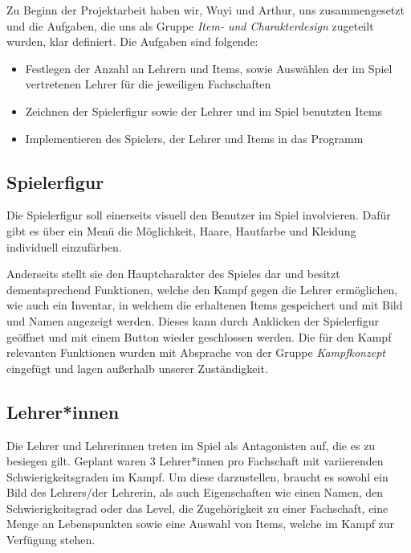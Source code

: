 Zu Beginn der Projektarbeit haben wir, Wuyi und Arthur, uns zusammengesetzt und die Aufgaben, die uns als Gruppe \emph{Item- und Charakterdesign} zugeteilt wurden, klar definiert. Die Aufgaben sind folgende:

\begin{itemize}
	\item Festlegen der Anzahl an Lehrern und Items, sowie Auswählen der im Spiel vertretenen Lehrer für die jeweiligen Fachschaften
	\item Zeichnen der Spielerfigur sowie der Lehrer und im Spiel benutzten Items
	\item Implementieren des Spielers, der Lehrer und Items in das Programm 
\end{itemize}

\subsection{Spielerfigur}
Die Spielerfigur soll einerseits visuell den Benutzer im Spiel involvieren. Dafür gibt es über ein Menü die Möglichkeit, Haare, Hautfarbe und Kleidung individuell einzufärben.

Anderseits stellt sie den Hauptcharakter des Spieles dar und besitzt dementsprechend Funktionen, welche den Kampf gegen die Lehrer ermöglichen, wie auch ein Inventar, in welchem die erhaltenen Items gespeichert und mit Bild und Namen angezeigt werden. Dieses kann durch Anklicken der Spielerfigur geöffnet und mit einem Button wieder geschlossen werden. Die für den Kampf relevanten Funktionen wurden mit Absprache von der Gruppe \emph{Kampfkonzept} eingefügt und lagen außerhalb unserer Zuständigkeit.

\subsection{Lehrer*innen}
Die Lehrer und Lehrerinnen treten im Spiel als Antagonisten auf, die es zu besiegen gilt. Geplant waren 3 Lehrer*innen pro Fachschaft mit variierenden Schwierigkeitsgraden im Kampf. Um diese darzustellen, braucht es sowohl ein Bild des Lehrers/der Lehrerin, als auch Eigenschaften wie einen Namen, den Schwierigkeitsgrad oder das \glqq{}Level\grqq{}, die Zugehörigkeit zu einer Fachschaft, eine Menge an Lebenspunkten sowie eine Auswahl von Items, welche im Kampf zur Verfügung stehen.

